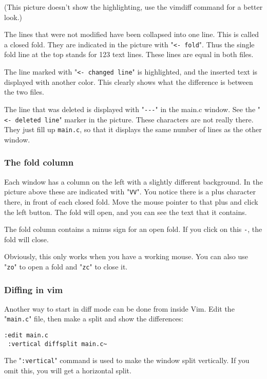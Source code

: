 (This picture doesn't show the highlighting, use the vimdiff command for a better look.)

The lines that were not modified have been collapsed into one line.
This is called a closed fold.
They are indicated in the picture with "\verb!<- fold!".
Thus the single fold line at the top stands for 123 text lines.
These lines are equal in both files.

The line marked with "\verb!<- changed line!" is highlighted, and the inserted text is displayed with another color.
This clearly shows what the difference is between the two files.

The line that was deleted is displayed with "\verb!---!" in the main.c window.
See the "\verb!<- deleted line!" marker in the picture.
These characters are not really there.
They just fill up \verb!main.c!, so that it displays the same number of lines as the other window.

\subsubsection{The fold column}
Each window has a column on the left with a slightly different background.
In the picture above these are indicated with "\verb!VV!".
You notice there is a plus character there, in front of each closed fold.
Move the mouse pointer to that plus and click the left button.
The fold will open, and you can see the text that it contains.

The fold column contains a minus sign for an open fold.
If you click on this \verb!-!, the fold will close.

Obviously, this only works when you have a working mouse.
You can also use "\verb!zo!" to open a fold and "\verb!zc!" to close it.

\subsubsection{Diffing in vim}
Another way to start in diff mode can be done from inside Vim.
Edit the "\verb!main.c!" file, then make a split and show the differences:

 \begin{Verbatim}[samepage=true]
 :edit main.c
 :vertical diffsplit main.c~ 
 \end{Verbatim}

The "\verb!:vertical!" command is used to make the window split vertically.
If you omit this, you will get a horizontal split.

